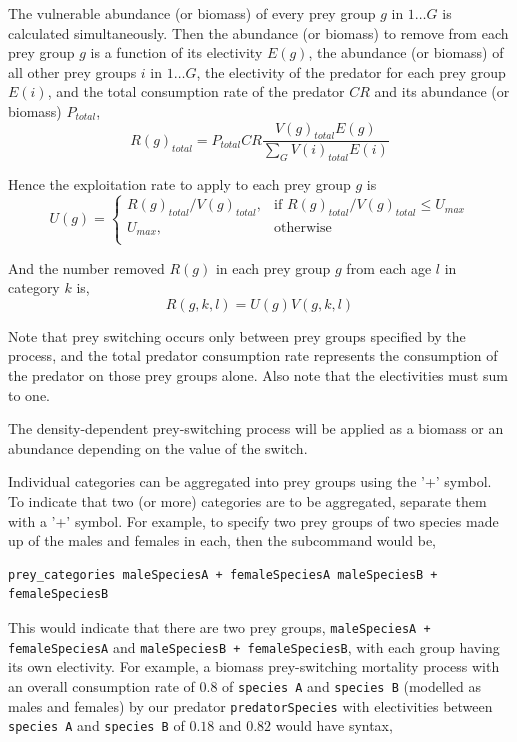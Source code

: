 The vulnerable abundance (or biomass) of every prey group $g$ in $1 \ldots G$ is calculated simultaneously. Then the abundance (or biomass) to remove from each prey group $g$ is a function of its electivity $E(g)$, the abundance (or biomass) of all other prey groups $i$ in $1 \ldots G$, the electivity of the predator for each prey group $E(i)$, and the total consumption rate of the predator $CR$ and its abundance (or biomass) $P_{total}$,
\begin{equation}
  R(g)_{total}=P_{total} CR \frac{V(g)_{total} E(g)}{\sum\limits_G {V(i)_{total} E(i)}}
\end{equation}

Hence the exploitation rate to apply to each prey group $g$ is 
\begin{equation}
U(g) = \begin{cases}
  R(g)_{total}/V(g)_{total}, & \text{if $R(g)_{total}/V(g)_{total} \leq U_{max}$} \\
  U_{max}, & \text{otherwise}\\ 
  \end{cases} 
\end{equation}

And the number removed $R(g)$ in each prey group $g$ from each age $l$ in category $k$ is,
\begin{equation}
  R(g,k,l) = U(g)V(g,k,l)
\end{equation}

Note that prey switching occurs only between prey groups specified by the process, and the total predator consumption rate represents the consumption of the predator on those prey groups alone. Also note that the electivities must sum to one. 

The density-dependent prey-switching process will be applied as a biomass or an abundance depending on the value of the  switch.

Individual categories can be aggregated into prey groups using the '+' symbol. To indicate that two (or more) categories are to be aggregated, separate them with a '+' symbol. For example, to specify two prey groups of two species made up of the males and females in each, then the subcommand would be,

{\small{\begin{verbatim}
prey_categories maleSpeciesA + femaleSpeciesA maleSpeciesB + femaleSpeciesB
\end{verbatim}}}

This would indicate that there are two prey groups, \texttt{maleSpeciesA + femaleSpeciesA} and \texttt{maleSpeciesB + femaleSpeciesB}, with each group having its own electivity. For example, a biomass prey-switching mortality process with an overall consumption rate of $0.8$ of \texttt{species A} and \texttt{species B} (modelled as males and females) by our predator \texttt{predatorSpecies} with electivities between \texttt{species A} and \texttt{species B} of $0.18$ and $0.82$ would have syntax,

